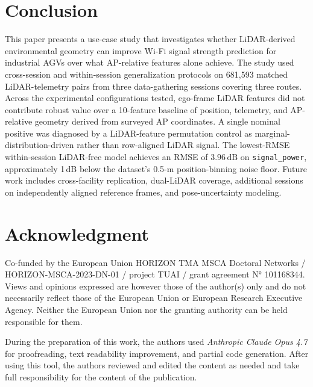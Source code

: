 \documentclass[conference]{IEEEtran}
\newcommand{\dB}{\,\mathrm{dB}}
\begin{document}
\section{Conclusion}
\label{sec:conclusion}

This paper presents a use-case study that investigates whether LiDAR-derived environmental geometry can improve Wi\nobreakdash-Fi signal strength prediction for industrial AGVs over what AP-relative features alone achieve. The study used cross-session and within-session generalization protocols on 681{,}593 matched LiDAR-telemetry pairs from three data-gathering sessions covering three routes. Across the experimental configurations tested, ego-frame LiDAR features did not contribute robust value over a 10-feature baseline of position, telemetry, and AP-relative geometry derived from surveyed AP coordinates. A single nominal positive was diagnosed by a LiDAR-feature permutation control as marginal-distribution-driven rather than row-aligned LiDAR signal. The lowest-RMSE within-session LiDAR-free model achieves an RMSE of $3.96\dB$ on \texttt{signal\_power}, approximately 1\,dB below the dataset's 0.5-m position-binning noise floor. Future work includes cross-facility replication, dual-LiDAR coverage, additional sessions on independently aligned reference frames, and pose-uncertainty modeling.



\section*{Acknowledgment}
Co-funded by the European Union HORIZON TMA MSCA Doctoral Networks / HORIZON-MSCA-2023-DN-01 / project TUAI / grant agreement N° 101168344. Views and opinions expressed are however those of the author(s) only and do not necessarily reflect those of the European Union or European Research Executive Agency.  Neither the European Union nor the granting authority can be held responsible for them.

During the preparation of this work, the authors used \textit{Anthropic Claude Opus 4.7} for proofreading, text readability improvement, and partial code generation. After using this tool, the authors reviewed and edited the content as needed and take full responsibility for the content of the publication.




\end{document}
